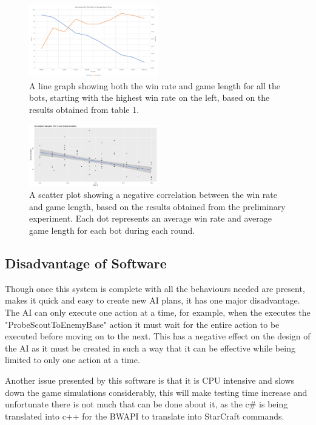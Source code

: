 \documentclass[journal]{IEEEtran}
\begin{document}
\begin{figure}[H]
	\centering
	\includegraphics[width=0.5\textwidth]{WinTimeLineWithBot}
	\caption{A line graph showing both the win rate and game length for all the bots, starting with the highest win rate on the left, based on the results obtained from table 1.}
	\label{Fig7}
\end{figure}
\begin{figure}[H]
	\centering
	\includegraphics[width=0.5\textwidth]{ScatterWinvsDurLine}
	\caption{A scatter plot showing a negative correlation between the win rate and game length, based on the results obtained from the preliminary experiment. Each dot represents an average win rate and average game length for each bot during each round.}
	\label{Fig8}
\end{figure}



\subsection{Disadvantage of Software}
Though once this system is complete with all the behaviours needed are present, makes it quick and easy to create new AI plans, it has one major disadvantage. The AI can only execute one action at a time, for example, when the executes the "ProbeScoutToEnemyBase" action it must wait for the entire action to be executed before moving on to the next. This has a negative effect on the design of the AI as it must be created in such a way that it can be effective while being limited to only one action at a time.

Another issue presented by this software is that it is CPU intensive and slows down the game simulations considerably, this will make testing time increase and unfortunate there is not much that can be done about it, as the c\# is being translated into c++ for the BWAPI to translate into StarCraft commands.
\end{document}
